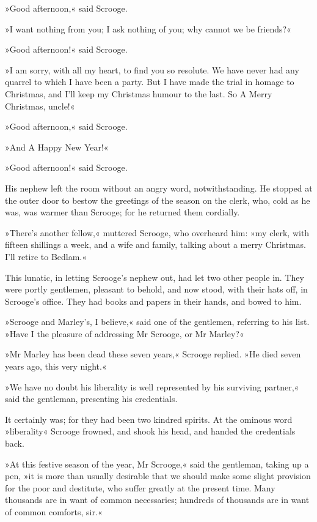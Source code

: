 »Good afternoon,« said Scrooge.

»I want nothing from you; I ask nothing of you; why cannot we be friends?«

»Good afternoon!« said Scrooge.

»I am sorry, with all my heart, to find you so resolute. We have never had any quarrel to which I have been a party. But I have made the trial in homage to Christmas, and I'll keep my Christmas humour to the last. So A Merry Christmas, uncle!«

»Good afternoon,« said Scrooge.

»And A Happy New Year!«

»Good afternoon!« said Scrooge.

His nephew left the room without an angry word, notwithstanding. He stopped at the outer door to bestow the greetings of the season on the clerk, who, cold as he was, was warmer than Scrooge; for he returned them cordially.

»There's another fellow,« muttered Scrooge, who overheard him: »my clerk, with fifteen shillings a week, and a wife and family, talking about a merry Christmas. I'll retire to Bedlam.«

This lunatic, in letting Scrooge's nephew out, had let two other people in. They were portly gentlemen, pleasant to behold, and now stood, with their hats off, in Scrooge's office. They had books and papers in their hands, and bowed to him.

»Scrooge and Marley's, I believe,« said one of the gentlemen, referring to his list. »Have I the pleasure of addressing Mr Scrooge, or Mr Marley?«

»Mr Marley has been dead these seven years,« Scrooge replied. »He died seven years ago, this very night.«

»We have no doubt his liberality is well represented by his surviving partner,« said the gentleman, presenting his credentials.

It certainly was; for they had been two kindred spirits. At the ominous word »liberality« Scrooge frowned, and shook his head, and handed the credentials back.

»At this festive season of the year, Mr Scrooge,« said the gentleman, taking up a pen, »it is more than usually desirable that we should make some slight provision for the poor and destitute, who suffer greatly at the present time. Many thousands are in want of common necessaries; hundreds of thousands are in want of common comforts, sir.«

